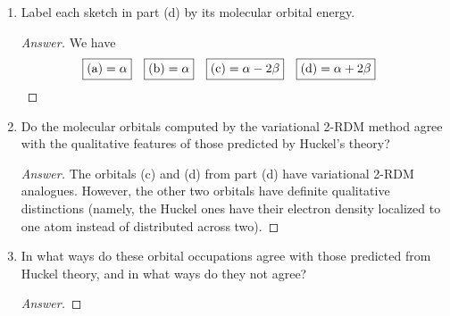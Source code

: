 \documentclass[../psets.tex]{subfiles}
\begin{document}
\begin{enumerate}
\begin{enumerate}
\begin{proof}[Answer]
\begin{figure}[h!]
\begin{subfigure}[b]{0.24\linewidth}
                    \caption{}
                \end{subfigure}
            \end{figure}
        \end{proof}
        \item Label each sketch in part (d) by its molecular orbital energy.
        \begin{proof}[Answer]
            We have
            \begin{align*}
                \Aboxed{\text{(a)} &= \alpha}&
                \Aboxed{\text{(b)} &= \alpha}&
                \Aboxed{\text{(c)} &= \alpha-2\beta}&
                \Aboxed{\text{(d)} &= \alpha+2\beta}
            \end{align*}
        \end{proof}
        \item Do the molecular orbitals computed by the variational 2-RDM method agree with the qualitative features of those predicted by Huckel's theory?
        \begin{proof}[Answer]
            The orbitals (c) and (d) from part (d) have variational 2-RDM analogues. However, the other two orbitals have definite qualitative distinctions (namely, the Huckel ones have their electron density localized to one atom instead of distributed across two).
        \end{proof}
        \item In what ways do these orbital occupations agree with those predicted from Huckel theory, and in what ways do they not agree?
        \begin{proof}[Answer]

\end{proof}
\end{enumerate}
\end{enumerate}
\end{document}
